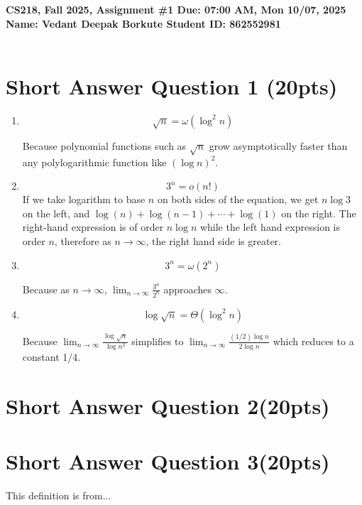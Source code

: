\documentclass{article}[12pt]
\newcommand{\deadline}{07:00 AM, Mon 10/07, 2025}
\newcommand{\assigntitle}[1]{{
  \noindent \large \bf
  CS218, Fall 2025,
  Assignment \##1 \hfill Due: {\deadline}\\
  Name: Vedant Deepak Borkute
  \hspace{2.5in}
  Student ID: 862552981
  \\
  [-.05in]
  \mbox{}\hrulefill \mbox{}\\}}
\begin{document}
\assigntitle{1}{}
\date{}


\section{Short Answer Question 1 (20pts)}
\begin{enumerate}

\item \[
\sqrt{n} = \omega\!\left(\log ^{2} n\right)
\]

Because polynomial functions such as $\sqrt{n}$ grow asymptotically faster than any polylogarithmic function like $(\log n)^2$. 

\item \[
3^n = o\!\left(n!\right)
\]
If we take logarithm to base $n$ on both sides of the equation, we get $n \log 3$ on the left, and $\log(n) + \log(n-1) + \cdots + \log(1)$ on the right. The right-hand expression is of order $n \log n$ while the left hand expression is order $n$, therefore as $n \to \infty$, the right hand side is greater. 

\item \[
3^n = \omega(2^n)\]

Because as $n \to \infty$, $\lim_{n \to \infty}\frac{3^n}{2^n}$  approaches $\infty$.

\item \[
\log{\sqrt{n}} = \Theta(\log^{2} n)
\]

Because $\lim_{n \to \infty} \frac{\log{\sqrt{n}}}{\log{n^2}}$ simplifies to $\lim_{n \to \infty} \frac{(1/2)\log{n}}{2\log{n}}$ which reduces to a constant 1/4.
\end{enumerate}

\section{Short Answer Question 2(20pts)}
\section{Short Answer Question 3(20pts)}



\begin{thebibliography}{99}
 This definition is from...
\end{thebibliography}
\end{document}
